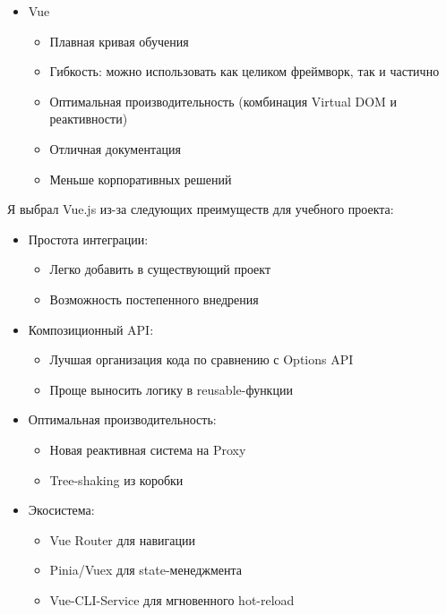 \documentclass{disser}
\begin{document}
\begin{itemize}
    \item Vue
        \begin{itemize}
            \item[+] Плавная кривая обучения
            \item[+] Гибкость: можно использовать как целиком фреймворк, так и частично
            \item[+] Оптимальная производительность (комбинация Virtual DOM и реактивности)
            \item[+] Отличная документация
            \item[-] Меньше корпоративных решений
        \end{itemize}
\end{itemize}

Я выбрал Vue.js из-за следующих преимуществ для учебного проекта:

\begin{itemize}
    \item Простота интеграции:
    \begin{itemize}
        \item Легко добавить в существующий проект
        \item Возможность постепенного внедрения
    \end{itemize}
    
    \item Композиционный API:
    \begin{itemize}
        \item Лучшая организация кода по сравнению с Options API
        \item Проще выносить логику в reusable-функции
    \end{itemize}
    
    \item Оптимальная производительность:
    \begin{itemize}
        \item Новая реактивная система на Proxy
        \item Tree-shaking из коробки
    \end{itemize}
    
    \item Экосистема:
    \begin{itemize}
        \item Vue Router для навигации
        \item Pinia/Vuex для state-менеджмента
        \item Vue-CLI-Service для мгновенного hot-reload
    \end{itemize}
    
\end{itemize}
\end{document}
